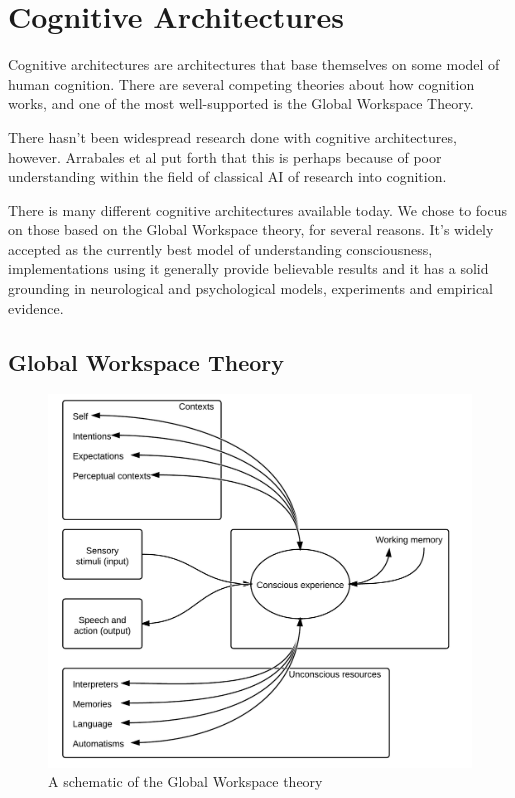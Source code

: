 \section{Cognitive Architectures}
\label{sec:cogarch}
Cognitive architectures are architectures that base themselves on some model of human cognition. There are several competing theories about how cognition works, and one of the most well-supported is the Global Workspace Theory.

There hasn't been widespread research done with cognitive architectures, however. Arrabales et al put forth that this is perhaps because of poor understanding within the field of classical AI of research into cognition. \cite{arrabales2009gamechars}

There is many different cognitive architectures available today\cite{duch2008cognitive}. We chose to focus on those based on the Global Workspace theory, for several reasons. It's widely accepted as the currently best model of understanding consciousness\cite{Franklin2012}, implementations using it generally provide believable results\cite{arrabales2009gamechars}\cite{snaider2011lida} and it has a solid grounding in neurological and psychological models, experiments and empirical evidence\cite{Franklin2012}.

\subsection{Global Workspace Theory}
\begin{figure}[h!tb]
\centering
\includegraphics[scale=1.0]{graphics/globalworkspace.png}
\caption{A schematic of the Global Workspace theory\cite{baars2005gwt}}
\label{fig:gwt}
\end{figure}

